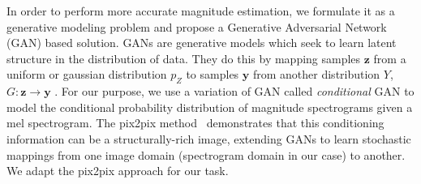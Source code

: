 \documentclass[a4paper]{article}
\begin{document}
In order to perform more accurate magnitude estimation, we formulate it as a generative modeling problem and propose a Generative Adversarial Network (GAN) \cite{goodfellow2014generative} based solution.
GANs are generative models which seek to learn latent structure in the distribution of data. They do this by mapping samples $\bm{z}$ from a uniform or gaussian distribution $p_Z$ to samples $\bm{y}$ from another distribution $Y$, $G: \bm{z}\rightarrow \bm{y}$ \cite{goodfellow2014generative}. 
For our purpose, we use a variation of GAN called \textit{conditional} GAN \cite{cGAN} to model the conditional probability distribution of magnitude spectrograms given a mel spectrogram. 
The pix2pix method~\cite{pix2pix} demonstrates that this conditioning information can be a structurally-rich image, extending GANs to learn stochastic mappings from one image domain (spectrogram domain in our case) to another.
We adapt the pix2pix approach for our task.
\end{document}
